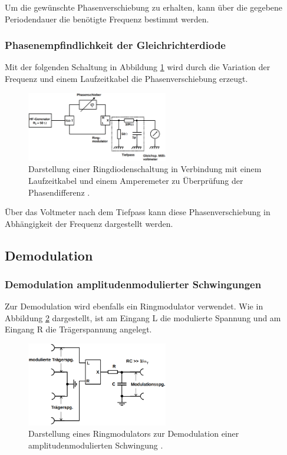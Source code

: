 Um die gewünschte Phasenverschiebung zu erhalten, kann über die gegebene Periodendauer die benötigte Frequenz bestimmt werden.

\subsubsection{Phasenempfindlichkeit der Gleichrichterdiode}
\label{sec:Phasenempfindlichkeit_der_Gleichrichterdiode}
Mit der folgenden Schaltung in Abbildung \ref{fig_11} wird durch die Variation der Frequenz und einem Laufzeitkabel die Phasenverschiebung erzeugt. 
\begin{figure}
    \centering
    \includegraphics[width=0.55\textwidth]{ressources/A11.png}
    \caption{Darstellung einer Ringdiodenschaltung in Verbindung mit einem Laufzeitkabel und einem Amperemeter zu Überprüfung der Phasendifferenz \cite{skript}.}
    \label{fig_11}
\end{figure}
Über das Voltmeter nach dem Tiefpass kann diese Phasenverschiebung in Abhängigkeit der Frequenz dargestellt werden.

\subsection{Demodulation}

\subsubsection{Demodulation amplitudenmodulierter Schwingungen}
\label{sec:Demodulation_amplitudenmodulieter_Schwingungen}
Zur Demodulation wird ebenfalls ein Ringmodulator verwendet. Wie in Abbildung \ref{fig_04} dargestellt, ist am Eingang L die modulierte Spannung und am Eingang R die Trägerspannung angelegt. 

\begin{figure}
    \centering
    \includegraphics[width=0.55\textwidth]{ressources/A4.png}
    \caption{Darstellung eines Ringmodulators zur Demodulation einer amplitudenmodulierten Schwingung \cite{skript}.}
    \label{fig_04}
\end{figure}

